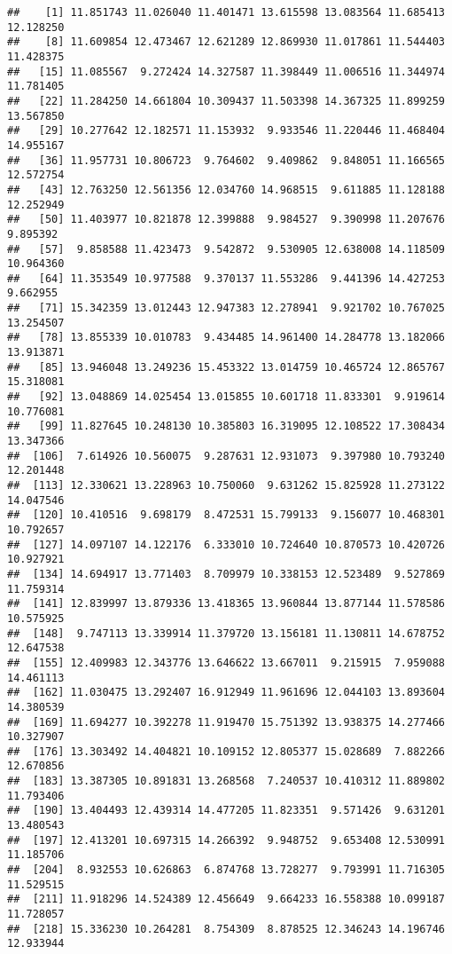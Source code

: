 \documentclass[
]{article}
\begin{document}
\begin{verbatim}
##    [1] 11.851743 11.026040 11.401471 13.615598 13.083564 11.685413 12.128250
##    [8] 11.609854 12.473467 12.621289 12.869930 11.017861 11.544403 11.428375
##   [15] 11.085567  9.272424 14.327587 11.398449 11.006516 11.344974 11.781405
##   [22] 11.284250 14.661804 10.309437 11.503398 14.367325 11.899259 13.567850
##   [29] 10.277642 12.182571 11.153932  9.933546 11.220446 11.468404 14.955167
##   [36] 11.957731 10.806723  9.764602  9.409862  9.848051 11.166565 12.572754
##   [43] 12.763250 12.561356 12.034760 14.968515  9.611885 11.128188 12.252949
##   [50] 11.403977 10.821878 12.399888  9.984527  9.390998 11.207676  9.895392
##   [57]  9.858588 11.423473  9.542872  9.530905 12.638008 14.118509 10.964360
##   [64] 11.353549 10.977588  9.370137 11.553286  9.441396 14.427253  9.662955
##   [71] 15.342359 13.012443 12.947383 12.278941  9.921702 10.767025 13.254507
##   [78] 13.855339 10.010783  9.434485 14.961400 14.284778 13.182066 13.913871
##   [85] 13.946048 13.249236 15.453322 13.014759 10.465724 12.865767 15.318081
##   [92] 13.048869 14.025454 13.015855 10.601718 11.833301  9.919614 10.776081
##   [99] 11.827645 10.248130 10.385803 16.319095 12.108522 17.308434 13.347366
##  [106]  7.614926 10.560075  9.287631 12.931073  9.397980 10.793240 12.201448
##  [113] 12.330621 13.228963 10.750060  9.631262 15.825928 11.273122 14.047546
##  [120] 10.410516  9.698179  8.472531 15.799133  9.156077 10.468301 10.792657
##  [127] 14.097107 14.122176  6.333010 10.724640 10.870573 10.420726 10.927921
##  [134] 14.694917 13.771403  8.709979 10.338153 12.523489  9.527869 11.759314
##  [141] 12.839997 13.879336 13.418365 13.960844 13.877144 11.578586 10.575925
##  [148]  9.747113 13.339914 11.379720 13.156181 11.130811 14.678752 12.647538
##  [155] 12.409983 12.343776 13.646622 13.667011  9.215915  7.959088 14.461113
##  [162] 11.030475 13.292407 16.912949 11.961696 12.044103 13.893604 14.380539
##  [169] 11.694277 10.392278 11.919470 15.751392 13.938375 14.277466 10.327907
##  [176] 13.303492 14.404821 10.109152 12.805377 15.028689  7.882266 12.670856
##  [183] 13.387305 10.891831 13.268568  7.240537 10.410312 11.889802 11.793406
##  [190] 13.404493 12.439314 14.477205 11.823351  9.571426  9.631201 13.480543
##  [197] 12.413201 10.697315 14.266392  9.948752  9.653408 12.530991 11.185706
##  [204]  8.932553 10.626863  6.874768 13.728277  9.793991 11.716305 11.529515
##  [211] 11.918296 14.524389 12.456649  9.664233 16.558388 10.099187 11.728057
##  [218] 15.336230 10.264281  8.754309  8.878525 12.346243 14.196746 12.933944

\end{verbatim}
\end{document}
